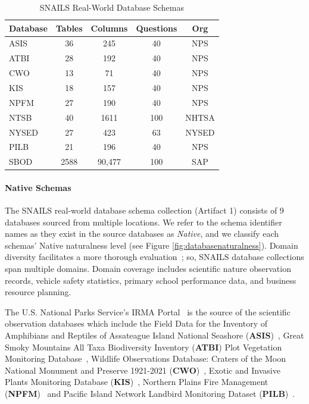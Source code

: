 \begin{table}[t]
  \centering
  \begin{tabular}{|p{2cm}|c|c|c|c|}
  \hline
  \textbf{Database} & \textbf{Tables} & \textbf{Columns} & \textbf{Questions} & \textbf{Org} \\
  \hline
  ASIS & 36 & 245 & 40 & NPS \\
  ATBI & 28 & 192 & 40 & NPS \\
  CWO & 13 & 71 & 40 & NPS \\
  KIS & 18 & 157 & 40 & NPS \\
  NPFM & 27 & 190 & 40 & NPS \\
  NTSB & 40 & 1611 & 100 & NHTSA \\
  NYSED & 27 & 423 & 63 & NYSED \\
  PILB & 21 & 196 & 40 & NPS \\
  SBOD & 2588 & 90,477 & 100 & SAP \\
  \hline
  \end{tabular}
  \caption{SNAILS Real-World Database Schemas}
  \label{table:benchmarkschemas}
\end{table}

\paragraph{\textbf{Native Schemas}}
The SNAILS real-world database schema collection (Artifact 1) consists of 9 databases sourced from multiple locations.
We refer to the schema identifier names as they exist in the source databases as \emph{Native}, and we classify each schemas' Native naturalness level (see Figure \ref{fig:databasenaturalness}).
Domain diversity facilitates a more thorough evaluation~\cite{finegan-dollak-etal-2018-improving}; so, SNAILS database collections span multiple domains.
Domain coverage includes scientific nature observation records, vehicle safety statistics, primary school performance data, and business resource planning.

The U.S. National Parks Service's IRMA Portal~\cite{nps-irma-portal} is the source of the scientific observation databases which include the 
Field Data for the Inventory of Amphibians and Reptiles of Assateague Island National Seashore (\textbf{ASIS})~\cite{assateague-herp}, 
Great Smoky Mountains All Taxa Biodiversity Inventory (\textbf{ATBI}) Plot Vegetation Monitoring Database~\cite{gsmnp-atbi}, 
Wildlife Observations Database: Craters of the Moon National Monument and Preserve 1921-2021 (\textbf{CWO})~\cite{craters-of-the-moon-wildlife}, 
Exotic and Invasive Plants Monitoring Database (\textbf{KIS})~\cite{klamath-inventory}, 
Northern Plains Fire Management (\textbf{NPFM})~\cite{ngp-fire}
and Pacific Island Network Landbird Monitoring Dataset (\textbf{PILB})~\cite{pilb-dataset}. 

